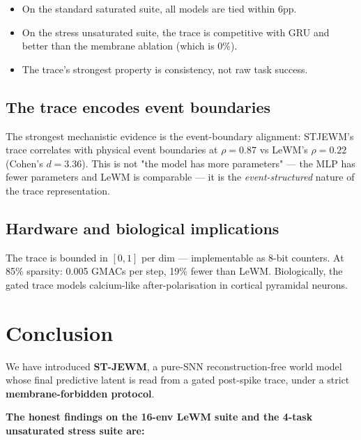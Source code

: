 \documentclass{article}
\begin{document}
\begin{itemize}
\item On the standard saturated suite, all models are tied within 6pp.
\item On the stress unsaturated suite, the trace is competitive with
      GRU and better than the membrane ablation (which is 0\%).
\item The trace's strongest property is consistency, not raw task success.
\end{itemize}

\subsection{The trace encodes event boundaries}

The strongest mechanistic evidence is the event-boundary alignment:
STJEWM's trace correlates with physical event boundaries at
$\rho = 0.87$ vs LeWM's $\rho = 0.22$ (Cohen's $d = 3.36$). This is
not "the model has more parameters" — the MLP has fewer parameters
and LeWM is comparable — it is the \emph{event-structured} nature of
the trace representation.

\subsection{Hardware and biological implications}

The trace is bounded in $[0,1]$ per dim — implementable as 8-bit
counters. At 85\% sparsity: 0.005 GMACs per step, 19\% fewer than
LeWM. Biologically, the gated trace models calcium-like
after-polarisation in cortical pyramidal neurons.

\section{Conclusion}

We have introduced \textbf{ST-JEWM}, a pure-SNN reconstruction-free world
model whose final predictive latent is read from a gated post-spike trace,
under a strict \textbf{membrane-forbidden protocol}.

\textbf{The honest findings on the 16-env LeWM suite and the 4-task
unsaturated stress suite are:}
\end{document}
